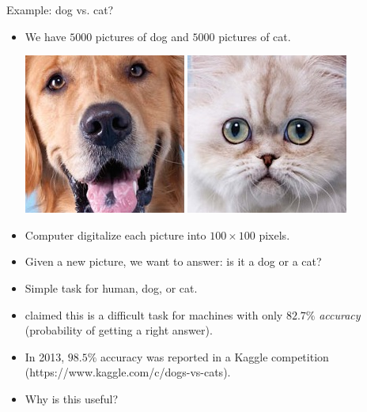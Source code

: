 \documentclass[first=purple,second=dgreen,logo=redexc]{aaltoslides}
\begin{document}
{	
\begin{frame}{Example: dog vs. cat?}
	\begin{itemize}
		\item We have $5000$ pictures of dog and $5000$ pictures of cat.
		\begin{center}
			\includegraphics[scale=0.3]{./figures/dog.jpg}
			\text{     }
			\includegraphics[scale=0.3]{./figures/cat.jpg}
		\end{center}
		\item Computer digitalize each picture into $100\times100$ pixels.
		\item Given a new picture, we want to answer: is it a dog or a cat?
		\item Simple task for human, dog, or cat.
		\item \citet{Golle08machine} claimed this is a difficult task for machines with only $82.7\%$ \textit{accuracy} (probability of getting a right answer).
		\item In 2013, $98.5\%$ accuracy was reported in a Kaggle competition (https://www.kaggle.com/c/dogs-vs-cats).
		\item Why is this useful?
	\end{itemize}
\end{frame}

}
\end{document}

